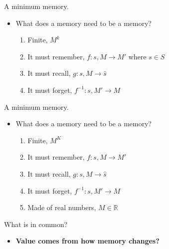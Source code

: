 \documentclass[10pt]{beamer}
\begin{document}
\begin{frame}[fragile]{A minimum memory.}
\begin{itemize}
    \item What does a memory need to be a memory?
    \begin{enumerate}
        \item Finite, $M^k$
        \item It must remember, $f : s, M \rightarrow M'$ where $s \in S$
        \item It must recall, $g : s, M \rightarrow \hat s$
        \item It must forget, $f^{-1} : s, M' \rightarrow M$
    \end{enumerate}
\end{itemize}
\end{frame}

\begin{frame}[fragile]{A minimum memory.}
\begin{itemize}
    \item What does a memory need to be a memory?
    \begin{enumerate}
        \item Finite, $M^K$
        \item It must remember, $f : s, M \rightarrow M'$
        \item It must recall, $g : s, M \rightarrow \hat s$
        \item It must forget, $f^{-1} : s, M' \rightarrow M$
        \item Made of real numbers, $M \in \mathbb{R}$
    \end{enumerate}
\end{itemize}
\end{frame}

\begin{frame}[fragile]{What is in common?}
\begin{itemize}
    \begin{itemize}
    \item Novelty
    \item Counts/Successors
    \item Information gain
    \item Mutual information
    \item State prediction
    \end{itemize}
    \item \textbf{Value comes from how memory changes?}
\end{itemize}
\end{frame}
\end{document}
